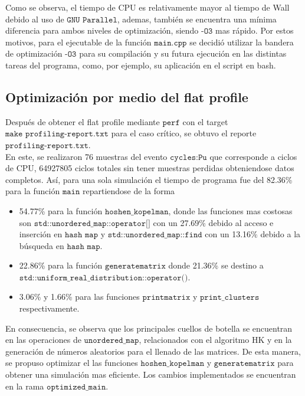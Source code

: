 \documentclass[12pt,a4paper]{article}
\begin{document}
Como se observa, el tiempo de CPU es relativamente mayor al tiempo de Wall debido al uso de $\texttt{GNU Parallel}$, ademas, también se encuentra una mínima diferencia para ambos niveles de optimización, siendo $\texttt{-O3}$ mas rápido. Por estos motivos, para el ejecutable de la función $\texttt{main.cpp}$ se decidió utilizar la bandera de optimización $\texttt{-O3}$ para su compilación y su futura ejecución en las distintas tareas del programa, como, por ejemplo, su aplicación en el script en bash.


\subsection{Optimización por medio del flat profile}

Después de obtener el flat profile mediante $\texttt{perf}$ con el target $\texttt{make profiling-report.txt}$ para el caso crítico, se obtuvo el reporte $\texttt{profiling-report.txt}$.
\\

En este, se realizaron 76 muestras del evento $\texttt{cycles:Pu}$ que corresponde a ciclos de CPU, 64927805 ciclos totales sin tener muestras perdidas obteniendose datos completos. Así, para una sola simulación el tiempo de programa fue del 82.36\% para la función $\texttt{main}$ repartiendose de la forma

\begin{itemize}
    \item 54.77\% para la función $\texttt{hoshen\_kopelman}$, donde las funciones mas costosas son $\texttt{std::unordered\_map::operator[]}$ con un 27.69\% debido al acceso e inserción en $\texttt{hash map}$ y $\texttt{std::unordered\_map::find}$ con un 13.16\% debido a la búsqueda en $\texttt{hash map}$.
    \item 22.86\% para la función $\texttt{generatematrix}$ donde 21.36\% se destino a\\ $\texttt{std::uniform\_real\_distribution::operator()}$.
    \item 3.06\% y 1.66\% para las funciones $\texttt{printmatrix}$ y $\texttt{print\_clusters}$ respectivamente.
\end{itemize}

En consecuencia, se observa que los principales cuellos de botella se encuentran en las operaciones de $\texttt{unordered\_map}$, relacionados con el algoritmo HK y en la generación de números aleatorios para el llenado de las matrices. De esta manera, se propuso optimizar el las funciones $\texttt{hoshen\_kopelman}$ y $\texttt{generatematrix}$ para obtener una simulación mas eficiente. Los cambios implementados se encuentran en la rama $\texttt{optimized\_main}$.
\\
\end{document}
